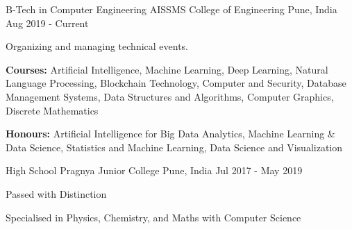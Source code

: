 

\begin{cventries}

  \cventry
    {B-Tech in Computer Engineering} %
    {AISSMS College of Engineering} %
    {Pune, India} %
    {Aug 2019 - Current} %
    {
      \begin{cvitems} %
        \item {Organizing and managing technical events.\hfill{}}
        \item {\textbf{Courses:} Artificial Intelligence, Machine Learning, Deep Learning, Natural Language Processing, Blockchain Technology, Computer and Security, Database Management Systems, Data Structures and Algorithms, Computer Graphics, Discrete Mathematics}
        \item {\textbf{Honours:} Artificial Intelligence for Big Data Analytics, Machine Learning \& Data Science, Statistics and Machine Learning, Data Science and Visualization}
      \end{cvitems}
    }
    
  \cventry
    {High School} %
    {Pragnya Junior College} %
    {Pune, India} %
    {Jul 2017 - May 2019} %
    {
      \begin{cvitems} %
        \item {Passed with Distinction}
        \item {Specialised in Physics, Chemistry, and Maths with Computer Science}
      \end{cvitems}
    }
\end{cventries}

